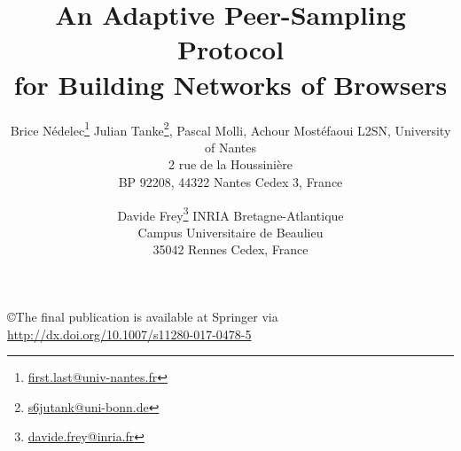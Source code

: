 \documentclass{class-for-drafts}
\begin{document}
\title{An Adaptive Peer-Sampling Protocol\\for Building Networks of Browsers}

\newcommand{\affLSNN}{L2SN, University of Nantes \\
  2 rue de la Houssini{\`e}re \\
  BP 92208, 44322 Nantes Cedex 3, France}

\newcommand{\affINRIA}{INRIA Bretagne-Atlantique \\
  Campus Universitaire de Beaulieu \\
  35042 Rennes Cedex, France}


\author{Brice
  N{\'e}delec\footnote{\label{univnantes}\url{first.last@univ-nantes.fr}}
  Julian Tanke\footnote{\url{s6jutank@uni-bonn.de}}, Pascal Molli, Achour
  Most{\'e}faoui \aff \affLSNN \and Davide
  Frey\footnote{\url{davide.frey@inria.fr}} \aff \affINRIA}


\copyright{The final publication is available at Springer via
  \url{http://dx.doi.org/10.1007/s11280-017-0478-5}}



\maketitle









%



\clearpage
  
\end{document}

